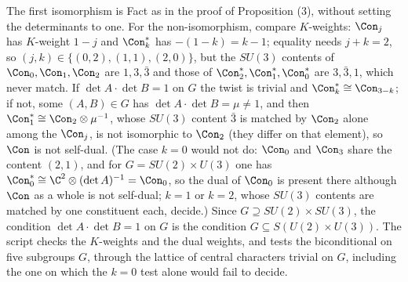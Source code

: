 The first isomorphism is Fact  as in the proof of Proposition (3), without setting the determinants to one. For the non-isomorphism, compare $K$-weights: $\Con_{j}$ has $K$-weight $1 - j$ and $\Con_{k}^{*}$ has $-(1 - k) = k - 1$; equality needs $j + k = 2$, so $(j, k) \in \{(0,2), (1,1), (2,0)\}$, but the $SU(3)$ contents of $\Con_{0}, \Con_{1}, \Con_{2}$ are $1, 3, \bar{3}$ and those of $\Con_{2}^{*}, \Con_{1}^{*}, \Con_{0}^{*}$ are $3, \bar{3}, 1$, which never match. If $\det A \cdot \det B = 1$ on $G$ the twist is trivial and $\Con_{k}^{*} \cong \Con_{3-k}$; if not, some $(A, B) \in G$ has $\det A \cdot \det B = \mu \neq 1$, and then $\Con_{1}^{*} \cong \Con_{2} \otimes \mu^{-1}$, whose $SU(3)$ content $\bar{3}$ is matched by $\Con_{2}$ alone among the $\Con_{j}$, is not isomorphic to $\Con_{2}$ (they differ on that element), so $\Con$ is not self-dual. (The case $k = 0$ would not do: $\Con_{0}$ and $\Con_{3}$ share the content $(2,1)$, and for $G = SU(2) \times U(3)$ one has $\Con_{0}^{*} \cong \C^{2} \otimes (\det A)^{-1} = \Con_{0}$, so the dual of $\Con_{0}$ is present there although $\Con$ as a whole is not self-dual; $k = 1$ or $k = 2$, whose $SU(3)$ contents are matched by one constituent each, decide.) Since $G \supseteq SU(2) \times SU(3)$, the condition $\det A \cdot \det B = 1$ on $G$ is the condition $G \subseteq S(U(2) \times U(3))$. The script checks the $K$-weights and the dual weights, and tests the biconditional on five subgroups $G$, through the lattice of central characters trivial on $G$, including the one on which the $k = 0$ test alone would fail to decide.
